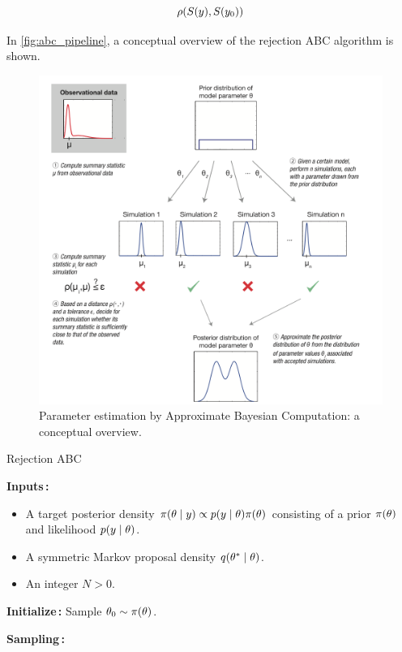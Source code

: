 \begin{equation}
    \rho \qty(S(y), S(y_0))
\end{equation}

In \autoref{fig:abc_pipeline}, a conceptual overview of the rejection ABC algorithm is shown. 

\begin{figure}[H]
    \centering 
    \includegraphics[scale=0.7]{./3_Images/abc_pipeline.png}
    \caption{Parameter estimation by Approximate Bayesian Computation: a conceptual overview.}
    \label{fig:abc_pipeline}
\end{figure}


\begin{algorithm}[H]
\caption{Rejection ABC}
\label{alg:mcmcabc}
\SetAlgoLined
\DontPrintSemicolon
 \textbf{Inputs\,:}\;
 \vspace{-5mm}
 \begin{itemize}
     \item A target posterior density $\pi \qty(\theta \mid y) \propto p \qty(y \mid \theta) \pi \qty(\theta)$ consisting of a prior $\pi \qty(\theta)$ and likelihood $p \qty(y \mid \theta)$. 
     \item A symmetric Markov proposal density $q \qty(\theta^* \mid \theta)$.
     \item An integer $N>0$.
 \end{itemize}
 
 \vspace{5mm}
 \textbf{Initialize\,:}\;
 Sample $\theta_0 \sim \pi \qty(\theta)$.\;

 \vspace{5mm}
 \textbf{Sampling\,:}\;
\end{algorithm}


